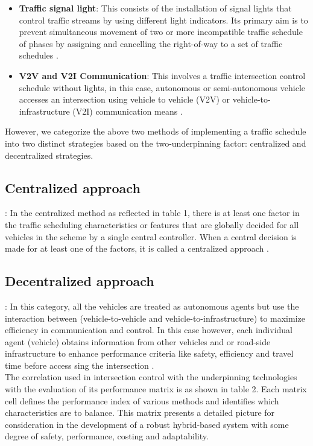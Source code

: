 \documentclass{book}
\begin{document}
\begin{itemize}
    \item \textbf{Traffic signal light}: This consists of the installation of signal lights that control traffic streams by using different light indicators. Its primary aim is to prevent simultaneous movement of two or more incompatible traffic schedule of phases by assigning and cancelling the right-of-way to a set of traffic schedules \cite{omae2010automatic, van2006impact, kamal2012control, treiber2000congested, papageorgiou2003review}.

 \item \textbf{V2V and V2I Communication}: This involves a traffic intersection control schedule without lights, in this case, autonomous or semi-autonomous vehicle accesses an intersection using vehicle to vehicle (V2V) or  vehicle-to-infrastructure (V2I) communication means \cite{ kamal2015vehicle, fajardo2011automated, au2015autonomous, montanaro2018towards, uno1999merging}.
\end{itemize}

However, we categorize the above two methods of implementing a traffic schedule into two distinct strategies  based on the two-underpinning factor:  centralized and decentralized strategies.

\subsection{Centralized approach}: In the centralized method as reflected in table 1, there is at least one factor in the traffic scheduling characteristics or features that are globally decided for all vehicles in the scheme by a single central controller. When a central decision is made for at least one of the factors, it is called a centralized approach \cite{milanes2010controller, litman2017autonomous, anderson2014autonomous, seshia2016towards}.

\subsection{Decentralized approach}: In this category, all the vehicles are treated as autonomous agents but use the interaction between  (vehicle-to-vehicle and vehicle-to-infrastructure) to maximize efficiency in communication and control. In this case however, each individual agent (vehicle) obtains information from other vehicles and or road-side infrastructure to enhance performance criteria like safety, efficiency and travel time before access sing the intersection \cite{claes2011decentralized,dresner2008multiagent, zeng2015novel, eguchi2007discrimination, ferreira2015methods, knorn2014passivity}.\\
The correlation used in intersection control with the underpinning technologies with the evaluation of its performance matrix is as shown in table 2. Each matrix cell defines the performance index of various methods and identifies which characteristics are to balance. This matrix presents a detailed picture for consideration in the development of a robust hybrid-based system with some degree of safety, performance, costing and adaptability.
\end{document}
